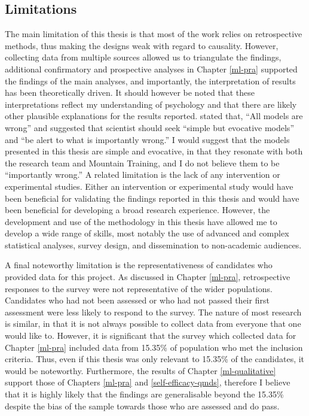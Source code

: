 \documentclass[
  12pt,
  a4paper,
]{book}
\begin{document}
\hypertarget{general-discussion-limitations}{%
\subsection{Limitations}\label{general-discussion-limitations}}

The main limitation of this thesis is that most of the work relies on retrospective methods, thus making the designs weak with regard to causality. However, collecting data from multiple sources allowed us to triangulate the findings, additional confirmatory and prospective analyses in Chapter \ref{ml-pra} supported the findings of the main analyses, and importantly, the interpretation of results has been theoretically driven. It should however be noted that these interpretations reflect my understanding of psychology and that there are likely other plausible explanations for the results reported. \citet{Box1976} stated that, ``All models are wrong'' and suggested that scientist should seek ``simple but evocative models'' and ``be alert to what is importantly wrong.'' I would suggest that the models presented in this thesis are simple and evocative, in that they resonate with both the research team and Mountain Training, and I do not believe them to be ``importantly wrong.'' A related limitation is the lack of any intervention or experimental studies. Either an intervention or experimental study would have been beneficial for validating the findings reported in this thesis and would have been beneficial for developing a broad research experience. However, the development and use of the methodology in this thesis have allowed me to develop a wide range of skills, most notably the use of advanced and complex statistical analyses, survey design, and dissemination to non-academic audiences.

A final noteworthy limitation is the representativeness of candidates who provided data for this project. As discussed in Chapter \ref{ml-pra}, retrospective responses to the survey were not representative of the wider populations. Candidates who had not been assessed or who had not passed their first assessment were less likely to respond to the survey. The nature of most research is similar, in that it is not always possible to collect data from everyone that one would like to. However, it is significant that the survey which collected data for Chapter \ref{ml-pra} included data from 15.35\% of population who met the inclusion criteria. Thus, even if this thesis was only relevant to 15.35\% of the candidates, it would be noteworthy. Furthermore, the results of Chapter \ref{ml-qualitative} support those of Chapters \ref{ml-pra} and \ref{self-efficacy-qmds}, therefore I believe that it is highly likely that the findings are generalisable beyond the 15.35\% despite the bias of the sample towards those who are assessed and do pass.
\end{document}
